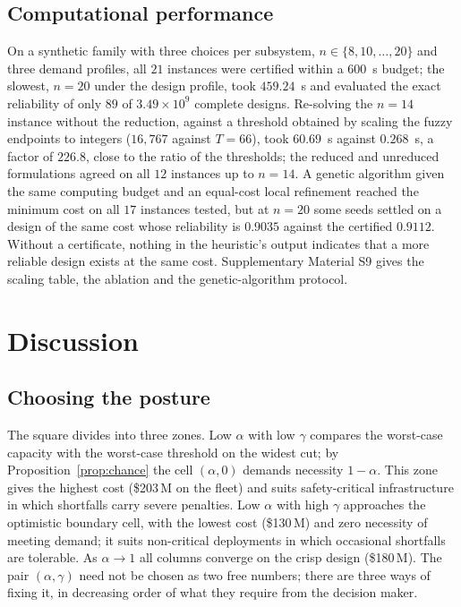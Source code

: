 \documentclass[Review,sagev,times]{sagej}%
\begin{document}
\subsection{Computational performance} \label{sec:scaling} \label{sec:baseline}
On a synthetic family with three choices per subsystem, $n\in\{8,10,\dots,20\}$ and three demand profiles,
all $21$ instances were certified within a $600$~s budget; the slowest, $n=20$ under the design profile, took
$459.24$~s and evaluated the exact reliability of only $89$ of $3.49\times10^{9}$ complete designs. Re-solving the $n=14$ instance without the
reduction, against a threshold obtained by scaling the fuzzy endpoints to integers ($16{,}767$ against $T=66$),
took $60.69$~s against $0.268$~s, a factor of $226.8$, close to the ratio of the thresholds; the reduced and
unreduced formulations agreed on all $12$ instances up to $n=14$. A genetic algorithm given the same computing
budget and an equal-cost local refinement reached the minimum cost on all $17$ instances tested, but at $n=20$
some seeds settled on a design of the same cost whose reliability is $0.9035$ against the certified $0.9112$.
Without a certificate, nothing in the heuristic's output indicates that a more reliable design exists at the
same cost. Supplementary Material S9 gives the scaling table, the ablation and the genetic-algorithm protocol.

\section{Discussion} \label{sec:discussion}

\subsection{Choosing the posture} \label{sec:managerial}
The square divides into three zones. Low $\alpha$ with low $\gamma$ compares the worst-case capacity with the
worst-case threshold on the widest cut; by Proposition~\ref{prop:chance} the cell $(\alpha,0)$ demands necessity
$1-\alpha$. This zone gives the highest cost (\$203\,M on the fleet) and suits safety-critical infrastructure in
which shortfalls carry severe penalties. Low $\alpha$ with high $\gamma$ approaches the optimistic boundary cell,
with the lowest cost (\$130\,M) and zero necessity of meeting demand; it suits non-critical deployments in which
occasional shortfalls are tolerable. As $\alpha\to1$ all columns converge on the crisp design (\$180\,M).
The pair $(\alpha,\gamma)$ need not be chosen as two free numbers; there are three ways of fixing it, in
decreasing order of what they require from the decision maker.
\end{document}
